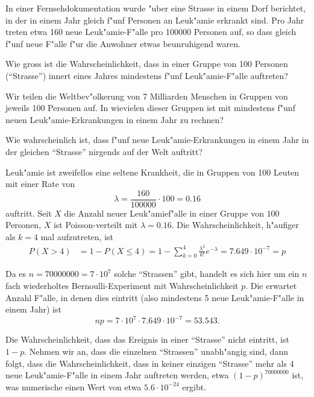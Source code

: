 In einer Fernsehdokumentation wurde "uber eine Strasse in einem Dorf berichtet,
in der in einem Jahr gleich f"unf Personen an Leuk"amie erkrankt sind.
Pro Jahr treten etwa 160 neue Leuk"amie-F"alle pro 100000 Personen auf,
so dass gleich f"unf neue F"alle f"ur die Anwohner etwas beunruhigend
waren.
\begin{teilaufgaben}
\item
Wie gross ist die Wahrscheinlichkeit, dass in einer Gruppe von
100 Personen (``Strasse'') innert eines Jahres mindestens f"unf
Leuk"amie-F"alle auftreten?
\item
Wir teilen die Weltbev"olkerung von 7 Milliarden Menschen
in Gruppen von jeweils 100 Personen auf.
In wievielen dieser Gruppen ist mit mindestens f"unf neuen
Leuk"amie-Erkrankungen in einem Jahr zu rechnen?
\item
Wie wahrscheinlich ist, dass f"unf neue Leuk"amie-Erkrankungen in einem 
Jahr in der gleichen ``Strasse'' nirgends auf der Welt auftritt?
\end{teilaufgaben}

\begin{loesung}
\begin{teilaufgaben}
\item
Leuk"amie ist zweifellos eine seltene Krankheit, die in Gruppen von 
100 Leuten mit einer Rate von 
\[
\lambda = \frac{160}{100000}\cdot 100=0.16
\]
auftritt.
Seit $X$ die Anzahl neuer Leuk"amief"alle in einer Gruppe von $100$
Personen, $X$ ist Poisson-verteilt mit $\lambda=0.16$.
Die Wahrscheinlichkeit, h"aufiger als $k=4$ mal aufzutreten, ist
\begin{align*}
P(X>4)
&=
1-P(X\le 4)
=
1-\sum_{k=0}^4 \frac{\lambda^k}{k!}e^{-\lambda}
=
7.649\cdot10^{-7}=p
\end{align*}
\item
Da es $n=70000000=7\cdot 10^7$ solche ``Strassen'' gibt, handelt es sich hier um
ein $n$ fach wiederholtes Bernoulli-Experiment mit Wahrscheinlichkeit $p$.
Die erwartet Anzahl F"alle, in denen dies eintritt (also mindestens 5
neue Leuk"amie-F"alle in einem Jahr) ist
\[
np=7\cdot 10^7\cdot 7.649\cdot 10^{-7}=53.543.
\]
\item
Die Wahrscheinlichkeit, dass das Ereignis in einer ``Strasse'' nicht eintritt,
ist $1-p$.
Nehmen wir an, dass die einzelnen ``Strassen'' unabh"angig sind, dann
folgt, dass die Wahrscheinlichkeit, dass in keiner einzigen ``Strasse''
mehr als 4 neue Leuk"amie-F"alle in einem Jahr auftreten werden, 
etwa $(1-p)^70000000$ ist, was numerische einen Wert von etwa
$5.6\cdot 10^{-24}$ ergibt.
\end{teilaufgaben}
\end{loesung}

\begin{bewertung}
\end{bewertung}



